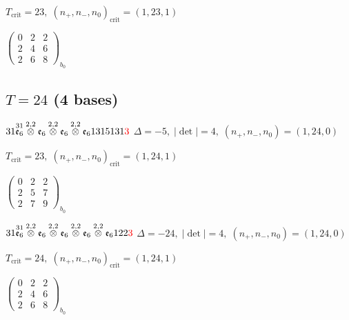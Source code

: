 \documentclass[10pt]{article}
\begin{document}
\hspace{1em}$T_{\text{crit}}=23,\; (n_+,n_-,n_0)_{\text{crit}}=(1,23,1)$

\hspace{2em}$\left(\begin{smallmatrix}0 & 2 & 2 \\ 2 & 4 & 6 \\ 2 & 6 & 8\end{smallmatrix}\right)_{\!b_0}$


\subsection*{$T = 24$ \quad (4 bases)}
\smallskip

$31\overset{31}{\mathfrak{e}_6}\overset{2,2}{\otimes}\mathfrak{e}_6\overset{2,2}{\otimes}\mathfrak{e}_6\overset{2,2}{\otimes}\mathfrak{e}_61315131\textcolor{red}{3}$ \quad $\Delta=-5,\; |\det|=4,\; (n_+,n_-,n_0)=(1,24,0)$

\hspace{1em}$T_{\text{crit}}=23,\; (n_+,n_-,n_0)_{\text{crit}}=(1,24,1)$

\hspace{2em}$\left(\begin{smallmatrix}0 & 2 & 2 \\ 2 & 5 & 7 \\ 2 & 7 & 9\end{smallmatrix}\right)_{\!b_0}$

\smallskip

$31\overset{31}{\mathfrak{e}_6}\overset{2,2}{\otimes}\mathfrak{e}_6\overset{2,2}{\otimes}\mathfrak{e}_6\overset{2,2}{\otimes}\mathfrak{e}_6\overset{2,2}{\otimes}\mathfrak{e}_6122\textcolor{red}{3}$ \quad $\Delta=-24,\; |\det|=4,\; (n_+,n_-,n_0)=(1,24,0)$

\hspace{1em}$T_{\text{crit}}=24,\; (n_+,n_-,n_0)_{\text{crit}}=(1,24,1)$

\hspace{2em}$\left(\begin{smallmatrix}0 & 2 & 2 \\ 2 & 4 & 6 \\ 2 & 6 & 8\end{smallmatrix}\right)_{\!b_0}$
\end{document}
